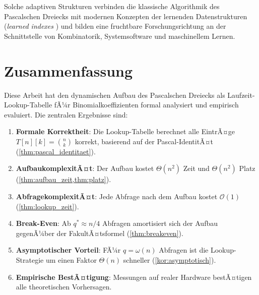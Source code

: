 ﻿\documentclass[12pt, a4paper]{article}
\newcommand{\Oh}{\mathcal{O}}
\theoremstyle{plain}
\theoremstyle{definition}
\theoremstyle{remark}
\renewcommand{\Oh}{\mathcal{O}}
\begin{document}
Solche adaptiven Strukturen verbinden die klassische Algorithmik des
Pascalschen Dreiecks mit modernen Konzepten der lernenden
Datenstrukturen (\emph{learned indexes} \cite{kraska2018case}) und
bilden eine fruchtbare Forschungsrichtung an der Schnittstelle
von Kombinatorik, Systemsoftware und maschinellem Lernen.


\section{Zusammenfassung}
\label{sec:zusammenfassung}

Diese Arbeit hat den dynamischen Aufbau des Pascalschen Dreiecks als
Laufzeit-Lookup-Tabelle fÃ¼r Binomialkoeffizienten formal analysiert
und empirisch evaluiert. Die zentralen Ergebnisse sind:

\begin{enumerate}[label=\textbf{(\arabic*)}]
  \item \textbf{Formale Korrektheit}: Die Lookup-Tabelle berechnet
        alle EintrÃ¤ge $T[n][k] = \binom{n}{k}$ korrekt, basierend auf
        der Pascal-IdentitÃ¤t (\cref{thm:pascal_identitaet}).
  \item \textbf{AufbaukomplexitÃ¤t}: Der Aufbau kostet $\Theta(n^2)$
        Zeit und $\Theta(n^2)$ Platz (\cref{thm:aufbau_zeit,thm:platz}).
  \item \textbf{AbfragekomplexitÃ¤t}: Jede Abfrage nach dem Aufbau
        kostet $\Oh(1)$ (\cref{thm:lookup_zeit}).
  \item \textbf{Break-Even}: Ab $q^* \approx n/4$ Abfragen amortisiert
        sich der Aufbau gegenÃ¼ber der FakultÃ¤tsformel
        (\cref{thm:breakeven}).
  \item \textbf{Asymptotischer Vorteil}: FÃ¼r $q = \omega(n)$ Abfragen
        ist die Lookup-Strategie um einen Faktor $\Theta(n)$ schneller
        (\cref{kor:asymptotisch}).
  \item \textbf{Empirische BestÃ¤tigung}: Messungen auf realer Hardware
        bestÃ¤tigen alle theoretischen Vorhersagen.
\end{enumerate}
\end{document}
